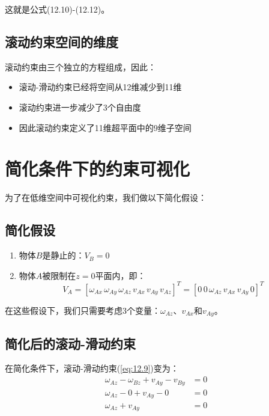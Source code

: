 \documentclass[12pt,a4paper]{article}
\begin{document}
这就是公式(12.10)-(12.12)。

\subsection{滚动约束空间的维度}

滚动约束由三个独立的方程组成，因此：
\begin{itemize}
\item 滚动-滑动约束已经将空间从12维减少到11维
\item 滚动约束进一步减少了3个自由度
\item 因此滚动约束定义了11维超平面中的9维子空间
\end{itemize}

\section{简化条件下的约束可视化}

为了在低维空间中可视化约束，我们做以下简化假设：

\subsection{简化假设}

\begin{enumerate}
\item 物体$B$是静止的：$V_B = 0$
\item 物体$A$被限制在$z = 0$平面内，即：
\begin{equation}
V_A = [\omega_{Ax} \, \omega_{Ay} \, \omega_{Az} \, v_{Ax} \, v_{Ay} \, v_{Az}]^T = [0 \, 0 \, \omega_{Az} \, v_{Ax} \, v_{Ay} \, 0]^T
\end{equation}
\end{enumerate}

在这些假设下，我们只需要考虑3个变量：$\omega_{Az}$、$v_{Ax}$和$v_{Ay}$。

\subsection{简化后的滚动-滑动约束}

在简化条件下，滚动-滑动约束(\ref{eq:12.9})变为：
\begin{align}
\omega_{Az} - \omega_{Bz} + v_{Ay} - v_{By} &= 0 \\
\omega_{Az} - 0 + v_{Ay} - 0 &= 0 \\
\omega_{Az} + v_{Ay} &= 0
\label{eq:simplified_roll_slide}
\end{align}
\end{document}
